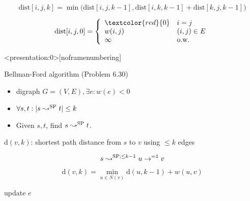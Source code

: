 
\begin{frame}{}
  \centerline{}

  \[
    \text{dist}[i,j,k] = \min \Big(\text{dist}[i,j,k-1], \text{dist}[i,k,k-1] + \text{dist}[k,j,k-1]\Big)
  \]


  \[
    \text{dist}[i,j,0] = \left\{\begin{array}{ll}
      \textcolor{red}{0} & i = j \\
      w(i,j) & (i,j) \in E \\
      \infty & \text{o.w.}
    \end{array} \right.
  \]
\end{frame}

\begin{frame}{}
  
\end{frame}

\begin{frame}<presentation:0>[noframenumbering]
  \begin{exampleblock}{Bellman-Ford algorithm (Problem 6.30)}
    \begin{itemize}
      \item digraph $G = (V, E), \exists e: w(e) < 0$
      \item $\forall s, t: |s \leadsto^{\text{SP}} t| \le k$
      \item Given $s,t$, find $s \leadsto^{\text{SP}} t$.
    \end{itemize}
  \end{exampleblock}

  $\text{d}(v,k)$: shortest path distance from $s$ to $v$ using $\le k$ edges

  \[
    s \leadsto^{\text{SP}; \le k-1} u \to^{=1} v
  \]

  \[
    \text{d}(v, k) = \min_{u \in N(v)} \text{d}(u, k-1) + w(u,v)
  \]

  \begin{center}
    \begin{minipage}{0.50\linewidth}
      \begin{algorithmic}[c]
		\State update $e$
	  \EndFor
	\EndFor
      \end{algorithmic}
    \end{minipage}
  \end{center}
\end{frame}

